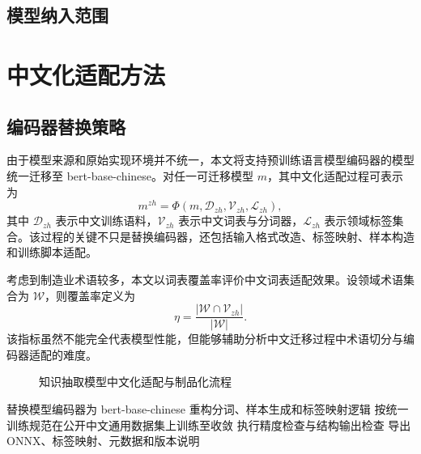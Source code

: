 \subsection{模型纳入范围}

\section{中文化适配方法}
\subsection{编码器替换策略}
由于模型来源和原始实现环境并不统一，本文将支持预训练语言模型编码器的模型统一迁移至 bert-base-chinese。对任一可迁移模型 $m$，其中文化适配过程可表示为
\begin{equation}
m^{zh}=\Phi(m,\mathcal{D}_{zh},\mathcal{V}_{zh},\mathcal{L}_{zh}),
\end{equation}
其中 $\mathcal{D}_{zh}$ 表示中文训练语料，$\mathcal{V}_{zh}$ 表示中文词表与分词器，$\mathcal{L}_{zh}$ 表示领域标签集合。该过程的关键不只是替换编码器，还包括输入格式改造、标签映射、样本构造和训练脚本适配。

考虑到制造业术语较多，本文以词表覆盖率评价中文词表适配效果。设领域术语集合为 $\mathcal{W}$，则覆盖率定义为
\begin{equation}
\eta=\frac{|\mathcal{W}\cap \mathcal{V}_{zh}|}{|\mathcal{W}|}.
\end{equation}
该指标虽然不能完全代表模型性能，但能够辅助分析中文迁移过程中术语切分与编码器适配的难度。

\begin{figure}[htbp]
  \centering
  \caption{知识抽取模型中文化适配与制品化流程}
  \label{fig:model_library_flow}
\end{figure}

\begin{algorithm}[htbp]
\caption{知识抽取模型中文化适配流程}
替换模型编码器为 bert-base-chinese\;
重构分词、样本生成和标签映射逻辑\;
按统一训练规范在公开中文通用数据集上训练至收敛\;
执行精度检查与结构输出检查\;
导出 ONNX、标签映射、元数据和版本说明\;
\;
\end{algorithm}

